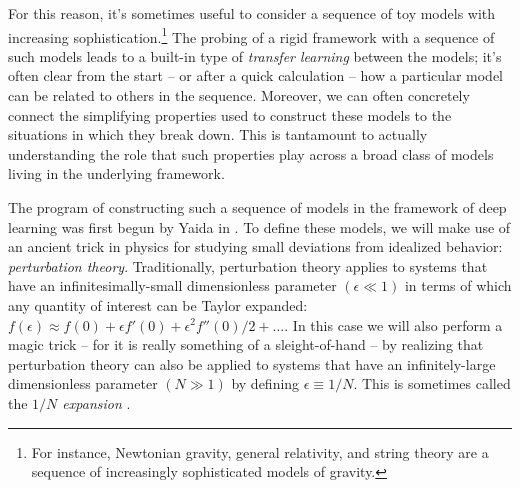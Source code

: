 \documentclass[12pt]{article}
\begin{document}
For this reason, it's sometimes useful to consider a sequence of toy models with increasing sophistication.\footnote{
    For instance, Newtonian gravity, general relativity, and string theory are a sequence of increasingly sophisticated models of gravity.
} 
The probing of a rigid framework 
    with a sequence of such models leads to a built-in type of \emph{transfer learning} between the models; it's often clear from the start -- or after a quick calculation -- how a particular model can be related to others in the sequence.
 Moreover, we can often
concretely connect the 
simplifying properties used to construct these models
to the situations in which they break down.  
This is tantamount to actually understanding the role that such properties play across a broad class of models living in the underlying framework.


















The program of constructing such a sequence of models in the framework of deep learning was first begun by Yaida in \cite{Yaida2019}. To define these models, we will make use
of an ancient trick in physics for studying small deviations from idealized behavior: 
\emph{perturbation theory}. 
Traditionally, perturbation theory applies to systems that have an infinitesimally-small dimensionless parameter $(\epsilon \ll 1)$ in terms of which any quantity of interest can be Taylor expanded: $f(\epsilon) \approx f(0) + \epsilon f'(0) +  \epsilon^2 f''(0)/2 + \dots$.
In this case we will also perform a magic trick -- for it is really something of a sleight-of-hand -- by realizing that perturbation theory can also be applied to systems that have an infinitely-large dimensionless parameter $(N \gg 1)$ by defining $\epsilon \equiv 1/N$. This is sometimes called the \emph{$1/N$ expansion} \cite{tHooft:1973jz}.
\end{document}
